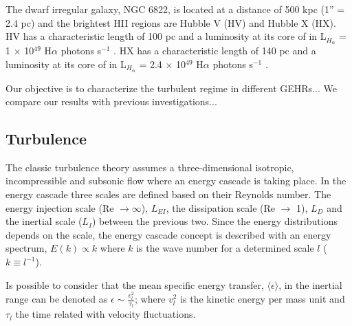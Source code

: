 \documentclass[fleqn,usenatbib]{mnras}
\begin{document}

The dwarf irregular galaxy, NGC 6822, is located at a distance of 500 kpc (1'' = 2.4 pc) \citep{1996AJ....112.1928G} and the brightest HII regions are Hubble V (HV) and Hubble X (HX). HV has a characteristic length of 100 pc and a luminosity at its core of in L$_{H_\alpha}$ = 1 $\times$ 10$^{49}$ H$\alpha$ photons s$^{-1}$ \citep{1999PASP..111.1382O}. HX has a characteristic length of 140 pc and a luminosity at its core of in L$_{H_\alpha}$ = 2.4 $\times$ 10$^{49}$ H$\alpha$ photons s$^{-1}$ \citep{1999PASP..111.1382O}.


Our objective is to characterize the turbulent regime in different GEHRs... We compare our results with previous investigations...

\subsection{Turbulence}\label{sec:turb}

The classic turbulence theory \citep{kolm1} assumes a three-dimensional isotropic, incompressible and subsonic flow where an energy cascade is taking place. %
In the energy cascade three scales are defined based on their Reynolds number. The energy injection scale (Re $\rightarrow \infty$), $L_{EI}$, the dissipation scale (Re $\rightarrow$ 1), $L_{D}$ and the inertial scale ($L_{I}$) between the previous two. Since the energy distributions depends on the scale, the energy cascade concept is described with an energy spectrum, $E(k) \propto k$ where $k$ is the wave number for a determined scale $l$ ($k \equiv l^{-1}$).

Is possible to consider that the mean specific energy transfer, $\langle \epsilon \rangle$, in the inertial range can be denoted as $\epsilon \sim \frac{v_{l}^{2}}{\tau_{l}}$; where $v_{l}^{2}$ is the kinetic energy per mass unit and $\tau_{l}$ the time related with velocity fluctuations. 
\end{document}
